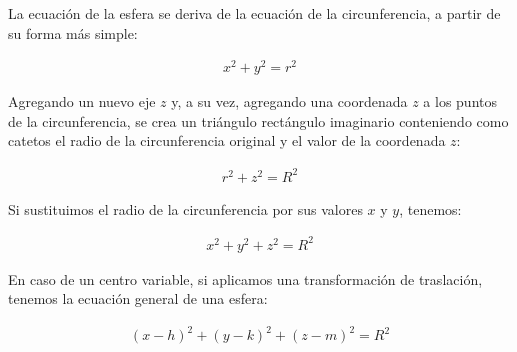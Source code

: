 La ecuación de la esfera se deriva de la ecuación de la circunferencia, a partir de su forma más simple:

\begin{eqnarray*}
  x^2+y^2=r^2
\end{eqnarray*}

Agregando un nuevo eje ${z}$ y, a su vez, agregando una coordenada ${z}$ a los puntos de la circunferencia, se crea un triángulo rectángulo imaginario conteniendo como catetos el radio de la circunferencia original y el valor de la coordenada ${z}$:

\begin{eqnarray*}
  r^2+z^2=R^2
\end{eqnarray*}

Si sustituimos el radio de la circunferencia por sus valores ${x}$ y ${y}$, tenemos:

\begin{eqnarray*}
  x^2+y^2+z^2=R^2
\end{eqnarray*}

En caso de un centro variable, si aplicamos una transformación de traslación, tenemos la ecuación general de una esfera:

\begin{eqnarray*}
  \left(x-h\right)^2+\left(y-k\right)^2+\left(z-m\right)^2=R^2
\end{eqnarray*}
